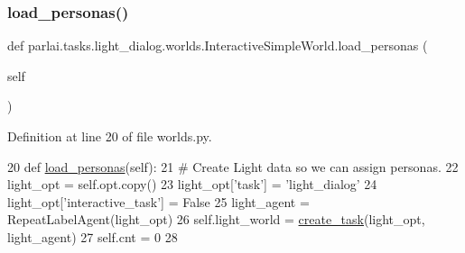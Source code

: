 \mbox{\label{classparlai_1_1tasks_1_1light__dialog_1_1worlds_1_1InteractiveSimpleWorld_a80912ce3904fd06850c824311c7d2731}} 
\subsubsection{\texorpdfstring{load\+\_\+personas()}{load\_personas()}}
{\footnotesize\ttfamily def parlai.\+tasks.\+light\+\_\+dialog.\+worlds.\+Interactive\+Simple\+World.\+load\+\_\+personas (\begin{DoxyParamCaption}\item[{}]{self }\end{DoxyParamCaption})}



Definition at line 20 of file worlds.\+py.


\begin{DoxyCode}
20     \textcolor{keyword}{def }\hyperlink{namespaceparlai_1_1tasks_1_1convai2_1_1worlds_a61a758b7cb43183397d002f7f203f586}{load\_personas}(self):
21         \textcolor{comment}{# Create Light data so we can assign personas.}
22         light\_opt = self.opt.copy()
23         light\_opt[\textcolor{stringliteral}{'task'}] = \textcolor{stringliteral}{'light\_dialog'}
24         light\_opt[\textcolor{stringliteral}{'interactive\_task'}] = \textcolor{keyword}{False}
25         light\_agent = RepeatLabelAgent(light\_opt)
26         self.light\_world = \hyperlink{namespaceparlai_1_1core_1_1worlds_a79969c7ba76d4b3c500f5bb776444dc6}{create\_task}(light\_opt, light\_agent)
27         self.cnt = 0
28 
\end{DoxyCode}
\mbox{\label{classparlai_1_1tasks_1_1light__dialog_1_1worlds_1_1InteractiveSimpleWorld_a7c10da25fd2d140416bb915b95ff603e}} 
